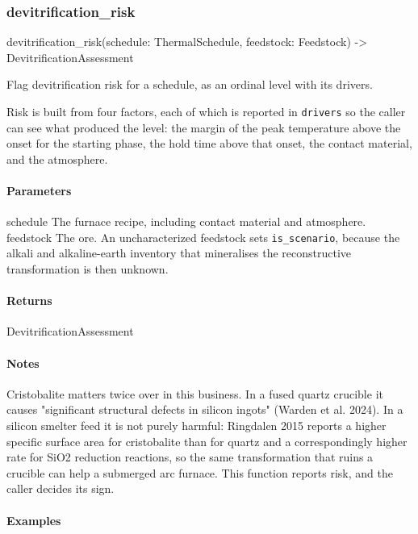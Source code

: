 \documentclass[10pt,a4paper,twoside]{report}
\begin{document}
\subsubsection*{devitrification\_risk}

\begin{verbatimsmall}
devitrification_risk(schedule: ThermalSchedule, feedstock: Feedstock) -> DevitrificationAssessment
\end{verbatimsmall}

Flag devitrification risk for a schedule, as an ordinal level with its drivers.

Risk is built from four factors, each of which is reported in \texttt{drivers} so the caller can see what produced the level: the margin of the peak temperature above the onset for the starting phase, the hold time above that onset, the contact material, and the atmosphere.

\paragraph*{Parameters}

schedule The furnace recipe, including contact material and atmosphere. feedstock The ore. An uncharacterized feedstock sets \texttt{is\_scenario}, because the alkali and alkaline-earth inventory that mineralises the reconstructive transformation is then unknown.

\paragraph*{Returns}

DevitrificationAssessment

\paragraph*{Notes}

Cristobalite matters twice over in this business. In a fused quartz crucible it causes "significant structural defects in silicon ingots" (Warden et al. 2024). In a silicon smelter feed it is not purely harmful: Ringdalen 2015 reports a higher specific surface area for cristobalite than for quartz and a correspondingly higher rate for SiO2 reduction reactions, so the same transformation that ruins a crucible can help a submerged arc furnace. This function reports risk, and the caller decides its sign.

\paragraph*{Examples}
\end{document}
